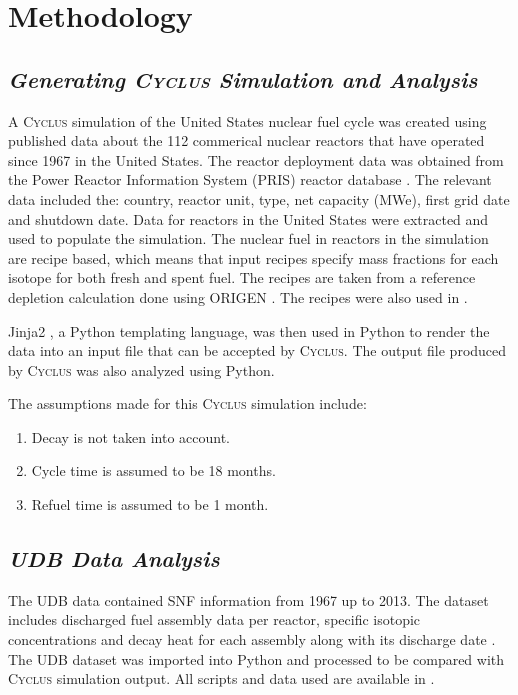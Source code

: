 \documentclass{anstrans}
\newcommand{\Cyclus}{\textsc{Cyclus}\xspace}%
\begin{document}
\section{Methodology}
\subsection{\textit{Generating \Cyclus Simulation and Analysis}}
A \Cyclus simulation of the United States nuclear fuel cycle was created using published data about the 112 commerical nuclear reactors that have operated since 1967 in the United States. The reactor deployment data was obtained from the Power Reactor Information System (PRIS) reactor database \cite{IAEA_pris_2017}. The relevant data included the: country, reactor unit, type, net capacity (MWe), first grid date and shutdown date. Data for reactors in the United States were extracted and used to populate the simulation. The nuclear fuel in reactors in the simulation are recipe based, which means that input recipes specify mass fractions for each isotope for both fresh and spent fuel. The recipes are taken from a reference depletion calculation done using ORIGEN \cite{bell_origen_1973}. The recipes were also used in \cite{wilson_adoption_2009, bae_synergistic_2017}. 

Jinja2 \cite{ronacher_welcome_2018}, a Python templating language, was then used in Python to render the data into an input file that can be accepted by \Cyclus. The output file produced by \Cyclus was also analyzed using Python. 

The assumptions made for this \Cyclus simulation include: 

\begin{enumerate}
	\item Decay is not taken into account. 
	\item Cycle time is assumed to be 18 months. 
	\item Refuel time is assumed to be 1 month. 
\end{enumerate}


\subsection{\textit{UDB Data Analysis}}
The UDB data contained SNF information from 1967 up to 2013. The dataset includes discharged fuel assembly data per reactor, specific isotopic concentrations and decay heat for each assembly along with its discharge date \cite{peterson_unf-st&dards_2017}. The UDB dataset was imported into Python and processed to be compared with \Cyclus simulation output. All scripts and data used are available in \cite{chee_arfc/transition-scenarios_2018}. 
\end{document}
